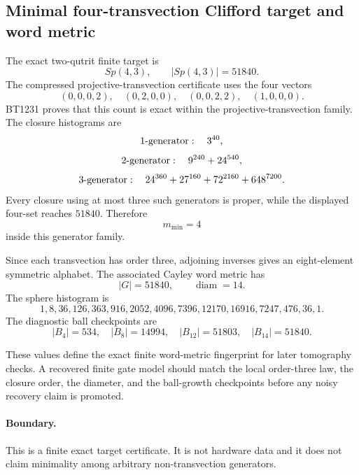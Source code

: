 \subsection{Minimal four-transvection Clifford target and word metric}
\label{sec:bt1236-minimal-clifford-word-metric}

The exact two-qutrit finite target is
\[
Sp(4,3),\qquad |Sp(4,3)|=51840.
\]
The compressed projective-transvection certificate uses the four vectors
\[
(0,0,0,2),\quad (0,2,0,0),\quad (0,0,2,2),\quad (1,0,0,0).
\]
BT1231 proves that this count is exact within the projective-transvection family. The closure histograms are
\[
1\hbox{-generator}:\quad 3^{40},
\]
\[
2\hbox{-generator}:\quad 9^{240}+24^{540},
\]
\[
3\hbox{-generator}:\quad 24^{360}+27^{160}+72^{2160}+648^{7200}.
\]
Every closure using at most three such generators is proper, while the displayed four-set reaches \(51840\). Therefore
\[
\boxed{m_{\min}=4}
\]
inside this generator family.

Since each transvection has order three, adjoining inverses gives an eight-element symmetric alphabet. The associated Cayley word metric has
\[
\boxed{|G|=51840,\qquad \operatorname{diam}=14.}
\]
The sphere histogram is
\[
\boxed{1,8,36,126,363,916,2052,4096,7396,12170,16916,7247,476,36,1.}
\]
The diagnostic ball checkpoints are
\[
\boxed{|B_4|=534,\quad |B_8|=14994,\quad |B_{12}|=51803,\quad |B_{14}|=51840.}
\]

These values define the exact finite word-metric fingerprint for later tomography checks. A recovered finite gate model should match the local order-three law, the closure order, the diameter, and the ball-growth checkpoints before any noisy recovery claim is promoted.

\paragraph{Boundary.}
This is a finite exact target certificate. It is not hardware data and it does not claim minimality among arbitrary non-transvection generators.
